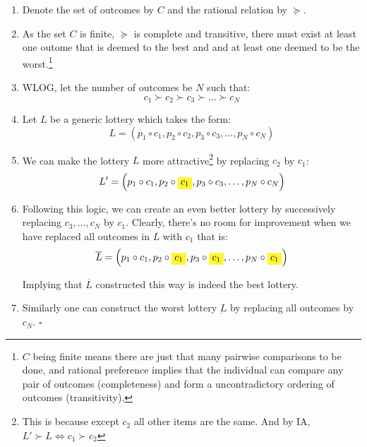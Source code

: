 \documentclass{tufte-handout}
\newcommand{\highlight}[1]{%
  \colorbox{yellow!80}{$\displaystyle#1$}}
\begin{document}
\begin{enumerate}

    \item Denote the set of outcomes by $C$ and the rational relation by $\succcurlyeq$.

    \item As the set $C$ is finite, $\succcurlyeq$ is complete and transitive, there must exist at least one outome that is deemed to the best and and at least one deemed to be the worst.\footnote{$C$ being finite means there are just that many pairwise comparisons to be done, and rational preference implies that the individual can compare any pair of outcomes (completeness) and form a uncontradictory ordering of outcomes (transitivity).}

    \item WLOG, let the number of outcomes be $N$ such that:
    $$c_1 \succ c_2 \succ c_3 \succ \dots \succ c_N$$

    \item Let $L$ be a generic lottery which takes the form:
    $$L = \left( p_1 \circ c_1, p_2 \circ c_2, p_3 \circ c_3, \dots, p_N \circ c_N \right)$$

    \item We can make the lottery $L$ more attractive\footnote{This is because except $c_2$ all other items are the same. And by IA, $L' \succ L \iff c_1 \succ c_2$} by replacing $c_2$ by $c_1$:
    $$L' = \left( p_1 \circ c_1, p_2 \circ \highlight{c_1}, p_3 \circ c_3, \dots, p_N \circ c_N \right)$$

    \item Following this logic, we can create an even better lottery by successively replacing $c_3, \dots, c_N$ by $c_1$. Clearly, there's no room for improvement when we have replaced all outcomes in $L$ with $c_1$ that is:
    $$\overline{L} = \left( p_1 \circ c_1, p_2 \circ \highlight{c_1}, p_3 \circ \highlight{c_1}, \dots, p_N \circ \highlight{c_1} \right)$$

    Implying that $\overline{L}$ constructed this way is indeed the best lottery.

    \item Similarly one can construct the worst lottery $\underbar{L}$ by replacing all outcomes by $c_N$. $\square$

\end{enumerate}

%
%
\end{document}
